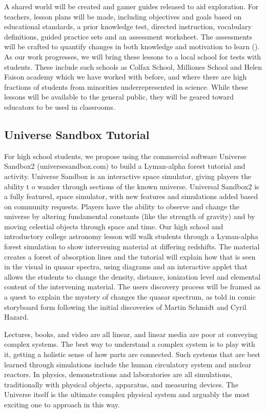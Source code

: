  A shared world will be created and gamer guides 
released to aid exploration. For teachers, lesson plans will be made, 
including  objectives and goals based on educational standards, a 
prior knowledge test, 
directed instruction, vocabulary definitions, guided practice sets and 
an assessment 
worksheet.
The assessments will be crafted to quantify changes in both knowledge 
and motivation to learn (\cite{Rosas03}).
 As our work progresses, we will bring these lessons to a local 
school 
for tests with students.
These include such schools as Colfax School, Milliones School and Helen Faison
academy which we have worked with before, and where there are high fractions
of students from minorities underrepresented in science.
 While these lessons will be available to the 
general public, they will be geared toward educators to be used in classrooms.

\subsection{Universe Sandbox Tutorial}


For high school students, we propose using the commercial software
Universe Sandbox2 (universesandbox.com) to build a Lyman-alpha forest
tutorial and activity.  Universe Sandbox is an interactive space
simulator, giving players the ability t o wander through sections of
the known universe. Universal Sandbox2 is a fully featured, space
simulator, with new features and simulations added based on community
requests. Players have the ability to observe and change the universe
by altering fundamental constants (like the strength of gravity) and
by moving celestial objects through space and time.  Our high school
and introductory college astronomy lesson will walk students through a
Lyman-alpha forest simulation to show intervening material at
differing redshifts. The material creates a forest of absorption lines
and the tutorial will explain how that is seen in the visual in quasar
spectra, using diagrams and an interactive applet that allows the
students to change the density, distance, ionization level and
elemental content of the intervening material. The users discovery
process will be framed as a quest to explain the mystery of changes
the quasar spectrum, as told in comic storyboard form following the
initial discoveries of Martin Schmidt and Cyril Hazard.


Lectures, books, and video are all linear, and linear media are poor at 
conveying complex systems.  The best way to understand a complex 
system is to play with it, getting a holistic sense of how parts are 
connected.  Such systems that are best learned through simulations 
include the human circulatory system and nuclear reactors. 
In physics, demonstrations and laboratories are all simulations, 
traditionally with physical objects, apparatus, and measuring devices.
The Universe itself is the ultimate complex physical system and arguably
the most exciting one to approach in this way.


